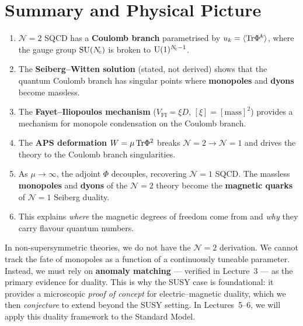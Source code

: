 \documentclass[11pt,a4paper]{article}
\begin{document}
\section{Summary and Physical Picture}
\label{sec:summary}

\begin{tcolorbox}[
  enhanced,
  colback=green!5!white,
  colframe=green!60!black,
  fonttitle=\bfseries,
  title={Lecture 4: Summary}
]
\begin{enumerate}
  \item $\mathcal{N}=2$ SQCD has a \textbf{Coulomb branch}
    parametrised by $u_k = \langle\mathrm{Tr}\Phi^k\rangle$, where the gauge
    group $\mathrm{SU}(N_{\!c})$ is broken to $\mathrm{U}(1)^{N_{\!c}-1}$.

  \item The \textbf{Seiberg--Witten solution} (stated, not derived)
    shows that the quantum Coulomb branch has singular points where
    \textbf{monopoles} and \textbf{dyons} become massless.

  \item The \textbf{Fayet--Iliopoulos mechanism} ($V_{\mathrm{FI}} =
    \xi D$, $[\xi] = [\mathrm{mass}]^2$) provides a mechanism for
    monopole condensation on the Coulomb branch.

  \item The \textbf{APS deformation} $W = \mu\,\mathrm{Tr}\Phi^2$ breaks
    $\mathcal{N}=2 \to \mathcal{N}=1$ and drives the theory to the
    Coulomb branch singularities.

  \item As $\mu \to \infty$, the adjoint $\Phi$ decouples, recovering
    $\mathcal{N}=1$ SQCD.  The massless \textbf{monopoles} and
    \textbf{dyons} of the $\mathcal{N}=2$ theory become the
    \textbf{magnetic quarks} of $\mathcal{N}=1$ Seiberg duality.

  \item This explains \emph{where} the magnetic degrees of freedom come
    from and \emph{why} they carry flavour quantum numbers.
\end{enumerate}
\end{tcolorbox}

\begin{previewbox}[title={Preview: Lectures 5--6}]
  In non-supersymmetric theories, we do not have the $\mathcal{N}=2$
  derivation.  We cannot track the fate of monopoles as a function of a
  continuously tuneable parameter.  Instead, we must rely on
  \textbf{anomaly matching} --- verified in Lecture~3 --- as the primary
  evidence for duality.  This is why the SUSY case is foundational: it
  provides a microscopic \emph{proof of concept} for electric--magnetic
  duality, which we then \emph{conjecture} to extend beyond the SUSY
  setting.  In Lectures~5--6, we will apply this duality framework to
  the Standard Model.
\end{previewbox}
\end{document}
